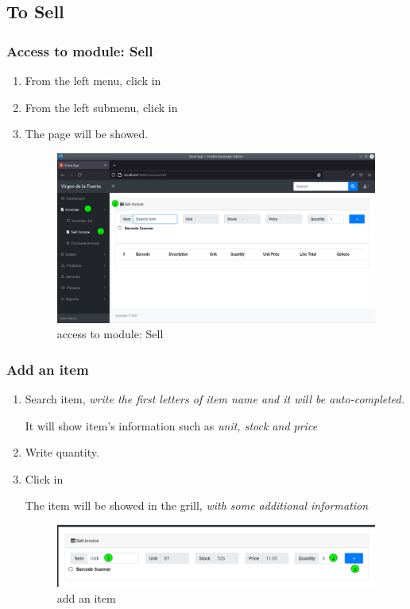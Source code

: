 \documentclass[a4paper,11pt]{refart}
\begin{document}
\subsection{To Sell}\label{section:to_sell}
\subsubsection{Access to module: Sell}
\begin{enumerate}
	\item From the left menu, click in  
	\item From the left submenu, click in  
	\item The page will be showed.
	\begin{figure}[H]\centering
		\includegraphics[width=\textwidth]{images/invoice_sell-access}
		\caption{access to module: Sell}
		\label{fig:invoice_sell-access}
	\end{figure}
\end{enumerate}

\subsubsection{Add an item}
\begin{enumerate}
	\item Search item, \emph{write the first letters of item name and it will be auto-completed.}
	\medskip
	\begin{leftbar}
		It will show item's information such as \emph{ unit, stock and price}
	\end{leftbar}
	\item Write quantity.
	\item Click in \keys{\texttt{+}}
	\medskip
	\begin{leftbar}
		The item will be showed in the grill,  \emph{with some additional information}
	\end{leftbar}
	\begin{figure}[H]\centering
		\includegraphics[width=\textwidth]{images/invoice_sell-item}
		\caption{add an item}\label{fig:invoice_sell-item}
	\end{figure}
\end{enumerate}
\end{document}
